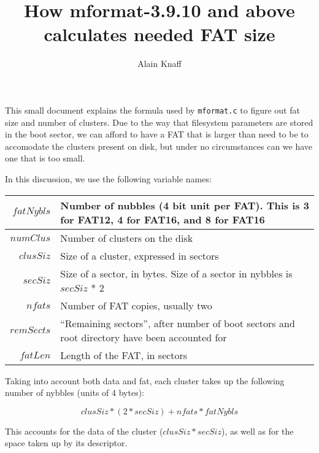\documentclass[a4paper,12pt]{article}
\author{Alain Knaff}
\title{How mformat-3.9.10 and above calculates needed FAT size}
\begin{document}
\maketitle

This small document explains the formula used by {\tt mformat.c} to
figure out fat size and number of clusters. Due to the way that
filesystem parameters are stored in the boot sector, we can afford to
have a FAT that is larger than need to be to accomodate the clusters
present on disk, but under no circumstances can we have one that is
too small.

In this discussion, we use the following variable names:

\begin{tabular}{|r|p{12cm}|}

\hline

$fatNybls$&
Number of nubbles (4 bit unit per FAT). This is 3 for FAT12, 4 for
FAT16, and 8 for FAT16\\

\hline

$numClus$&
Number of clusters on the disk\\

\hline

$clusSiz$&
Size of a cluster, expressed in sectors\\

\hline

$secSiz$&
Size of a sector, in bytes. Size of a sector in nybbles is $secSiz$ * 2\\

\hline

$nfats$&
Number of FAT copies, usually two\\

\hline

$remSects$&
``Remaining sectors'', after number of boot sectors and root directory
have been accounted for\\

\hline

$fatLen$&
Length of the FAT, in sectors\\

\hline


\end{tabular}


Taking into account both data and fat, each cluster takes up the
following number of nybbles (units of 4 bytes):


$$clusSiz * (2*secSiz)  + nfats * fatNybls$$
	
This accounts for the data of the cluster ($clusSiz * secSiz$),
as well as for the space taken up by its descriptor.
\end{document}
